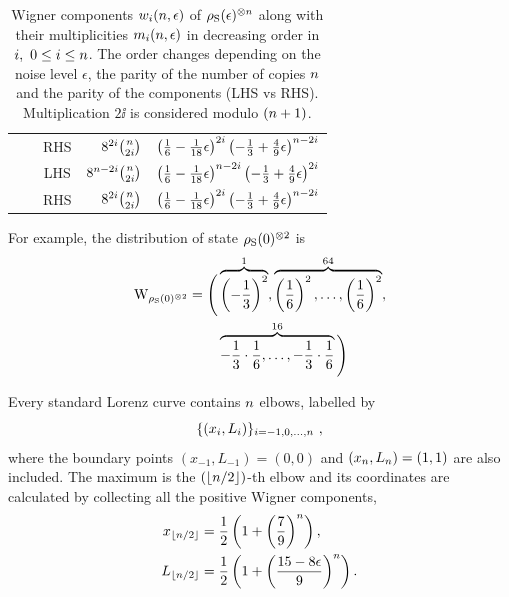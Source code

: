 \begin{table}[h]
\begin{tabular}{c|c|c|r|r}
    & & RHS & $8^{2i}\binom{n}{2i}$ & $\left( \frac{1}{6} - \frac{1}{18}\epsilon \right)^{2i}\left( -\frac{1}{3} + \frac{4}{9}\epsilon \right)^{n-2i}$ \\ \cline{2-5}
    & \multirow{2}{*}{\raisebox{-2ex}{\rotatebox[origin=c]{90}{$\NN$ odd}}} & LHS & $8^{n-2i}\binom{n}{2i}$ & $\left( \frac{1}{6} - \frac{1}{18}\epsilon \right)^{n-2i}\left( -\frac{1}{3} + \frac{4}{9}\epsilon \right)^{2i}$ \\
    & & RHS & $8^{2i}\binom{n}{2i}$ & $\left( \frac{1}{6} - \frac{1}{18}\epsilon \right)^{2i}\left( -\frac{1}{3} + \frac{4}{9}\epsilon \right)^{n-2i}$ \\ \hline
  \end{tabular}
  \caption{Wigner components $w_{i}(n, \epsilon)$ of $\rho_{\rm{S}}(\epsilon)^{\otimes n}$ along with their multiplicities $m_{i}(n, \epsilon)$ in decreasing order in $i,\ 0 \leq i \leq n$.
  The order changes depending on the noise level $\epsilon$, the parity of the number of copies $\NN$ and the parity of the components (LHS vs RHS).
  Multiplication $2\ii$ is considered modulo $(n+1)$.}
  \label{tab:lcsu}
\end{table}

For example, the distribution of state $\rho_{\rm{S}}(0)^{\otimes 2}$ is
\begin{equation*}
	\begin{split}
	\rm{W}_{\rho_{\rm{S}}(0)^{\otimes 2}} = \Bigg( &\overbrace{\left( -\frac{1}{3} \right)^2}^1, \overbrace{\left( \frac{1}{6} \right)^2, \dots, \left( \frac{1}{6} \right)^2}^{64}, \\
	&\overbrace{ -\frac{1}{3} \cdot \frac{1}{6}, \dots, -\frac{1}{3} \cdot \frac{1}{6}}^{16} \Bigg)
	\end{split}
\end{equation*}

Every standard Lorenz curve contains $\NN$ elbows, labelled by 
\begin{equation*}
\{(x_{\ii}, L_{\ii})\}_{\ii=-1,0,\dots,\NN}\ ,
\end{equation*}
where the boundary points $(x_{-1}, L_{-1}) = (0,0)$ and $(x_{n}, L_{n}) = (1,1)$ are also included.
The maximum is the $(\lfloor n/2 \rfloor)$-th elbow and its coordinates are calculated by collecting all the positive Wigner components,
\begin{align}
	x_{\lfloor n/2 \rfloor} &= \frac{1}{2}\left(1 + \left(\frac{7}{9}\right)^n\right), \\
	L_{\lfloor n/2 \rfloor} &= \frac{1}{2}\left (1 + \left(\frac{15 - 8\epsilon}{9}\right)^n \right).
\end{align}

